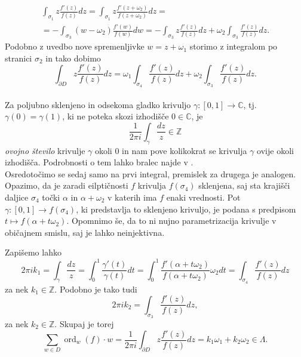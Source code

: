 \documentclass[mat1]{fmfdelo}
\newcommand{\Z}{\mathbb Z}
\newcommand{\C}{\mathbb C}
\newcommand{\ord}[2]{\operatorname{ord}_{#1}(#2)}
\theoremstyle{definition}
\begin{document}
\begin{dokaz}
    \begin{multline*}
        \int_{\sigma_1} z \frac{f'(z)}{f(z)}dz = 
        \int_{\sigma_1} z \frac{f'(z + \omega_2)}{f(z + \omega_2)}dz = \\ = 
        - \int_{\sigma_3} (w - \omega_2) \frac{f'(w)}{f(w)}dw = 
        - \int_{\sigma_3} z \frac{f'(z)}{f(z)}dz + \omega_2 \int_{\sigma_3} \frac{f'(z)}{f(z)}dz.
    \end{multline*}
    Podobno z uvedbo nove spremenljivke $w = z + \omega_1$ storimo z integralom po stranici $\sigma_2$ in tako dobimo
    \[
        \int_{\partial D} z \frac{f'(z)}{f(z)}dz = \omega_1 \int_{\sigma_4} \frac{f'(z)}{f(z)}dz + \omega_2 \int_{\sigma_3} \frac{f'(z)}{f(z)}dz.
    \]
    \\

    Za poljubno sklenjeno in odsekoma gladko krivuljo $\gamma : [0,1] \to \C$, tj. $\gamma(0) = \gamma(1)$, ki ne poteka skozi izhodišče $0\in \C$, je
    \[
        \frac{1}{2 \pi i} \int_\gamma \frac{dz}{z} \in \Z
    \]
    \emph{ovojno število} krivulje $\gamma$ okoli $0$ in nam pove kolikokrat se krivulja $\gamma$ ovije okoli izhodišča. Podrobnosti o tem lahko bralec najde v \cite[4.2.1.]{Ahlfors}.
    \\

    Osredotočimo se sedaj samo na prvi integral, premislek za drugega je analogen. Opazimo, da je zaradi eilptičnosti $f$ krivulja $f(\sigma_4)$ sklenjena, saj sta krajišči daljice $\sigma_4$ točki $\alpha$ in $\alpha + \omega_2$ v katerih ima $f$ enaki vrednosti. Pot $\gamma : [0,1] \to f(\sigma_4)$, ki predstavlja to sklenjeno krivuljo, je podana s predpisom $t \mapsto f(\alpha + t\omega_2)$. Opomnimo še, da to ni nujno parametrizacija krivulje v običajnem smislu, saj je lahko neinjektivna. 
    
    Zapišemo lahko 
    \[
        2 \pi i k_1 = 
        \int_{\gamma} \frac{dz}{z} = 
        \int_0^1 \frac{\gamma'(t)}{\gamma(t)}dt =
        \int_0^1 \frac{f'(\alpha + t\omega_2)}{f(\alpha + t\omega_2)}\omega_2 dt = 
        \int_{\sigma_4} \frac{f'(z)}{f(z)}dz
    \]
    za nek $k_1 \in \Z$. Podobno je tako tudi
    \[
        2 \pi i k_2 = \int_{\sigma_3} \frac{f'(z)}{f(z)}dz,
    \]
    za nek $k_2 \in \Z$. Skupaj je torej 
    \[
        \sum_{w \in D} \ord{w}{f} \cdot w = 
        \frac{1}{2 \pi i} \int_{\partial D} z\frac{f'(z)}{f(z)}dz = 
        k_1 \omega_1 + k_2 \omega_2\in \Lambda.  
    \]
\end{dokaz}
\end{document}
